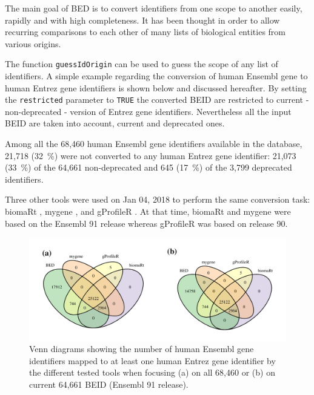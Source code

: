 \documentclass[9pt,a4paper,]{extarticle}
\newenvironment{Shaded}{\begin{snugshade}}{\end{snugshade}}
\newcommand{\KeywordTok}[1]{\textcolor[rgb]{0.13,0.29,0.53}{\textbf{#1}}}
\newcommand{\DataTypeTok}[1]{\textcolor[rgb]{0.13,0.29,0.53}{#1}}
\newcommand{\StringTok}[1]{\textcolor[rgb]{0.31,0.60,0.02}{#1}}
\newcommand{\OtherTok}[1]{\textcolor[rgb]{0.56,0.35,0.01}{#1}}
\newcommand{\OperatorTok}[1]{\textcolor[rgb]{0.81,0.36,0.00}{\textbf{#1}}}
\newcommand{\NormalTok}[1]{#1}
\theoremstyle{definition}
\theoremstyle{definition}
\theoremstyle{definition}
\theoremstyle{remark}
\begin{document}
The main goal of BED is to convert identifiers from one scope to another
easily, rapidly and with high completeness.
It has been thought in order to allow recurring comparisons to each other of
many lists of biological entities from various origins.

The function \texttt{guessIdOrigin} can be used to guess the scope
of any list of identifiers.
A simple example regarding the conversion of human Ensembl
gene to human Entrez gene identifiers is shown below and discussed hereafter.
By setting the \texttt{restricted} parameter to \texttt{TRUE} the converted BEID are
restricted to current - non-deprecated - version of Entrez gene identifiers.
Nevertheless all the input BEID are taken into account,
current and deprecated ones.

\begin{Shaded}
\end{Shaded}

Among all the 68,460
human Ensembl gene identifiers available in the
database, 21,718
(32~\%)
were not converted to any human Entrez gene
identifier: 21,073
(33~\%)
of the 64,661 non-deprecated
and 645
(17~\%)
of the 3,799 deprecated identifiers.

Three other tools were used on Jan 04, 2018
to perform the same conversion task:
biomaRt \citep{kinsella_ensembl_2011, durinck_mapping_2009},
mygene \citep{wu_biogps_2013, mark_mygene:_2014},
and gProfileR \citep{reimand_g:profiler-web_2016, reimand_gprofiler:_2016}.
At that time, biomaRt and mygene were based on the Ensembl 91 release
whereas gProfileR was based on release 90.

\begin{figure}

{\centering \includegraphics[width=1\linewidth]{BED-F1000-Article_files/figure-latex/vennTools-1} 

}

\caption{Venn diagrams showing the number of human Ensembl gene identifiers mapped to at least one human Entrez gene identifier by the different tested tools when focusing (a) on all 68,460 or (b) on current 64,661 BEID (Ensembl 91 release).}\label{fig:vennTools}
\end{figure}
\end{document}
